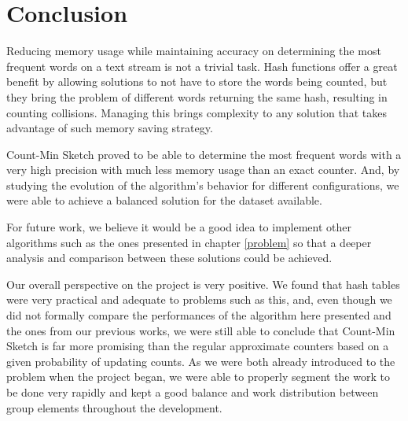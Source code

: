 \documentclass[shortpaper]{revdetua}
\begin{document}
\newpage
\section{Conclusion}

Reducing memory usage while maintaining accuracy on determining the most frequent words on a text stream is not a trivial task.
Hash functions offer a great benefit by allowing solutions to not have to store the words being counted, but they bring the problem of different words 
returning the same hash, resulting in counting collisions.
Managing this brings complexity to any solution that takes advantage of such memory saving strategy. 

Count-Min Sketch proved to be able to determine the most frequent words with a very high precision with much less memory usage than an exact counter.
And, by studying the evolution of the algorithm's behavior for different configurations, we were able to achieve a balanced solution for the dataset available.

For future work, we believe it would be a good idea to implement other algorithms such as the ones presented in chapter \ref{problem} so that a deeper analysis 
and comparison between these solutions could be achieved.

Our overall perspective on the project is very positive.
We found that hash tables were very practical and adequate to problems such as this, and, even though we did not formally compare the performances of the 
algorithm here presented and the ones from our previous works, we were still able to conclude that Count-Min Sketch is far more promising than the regular 
approximate counters based on a given probability of updating counts.
As we were both already introduced to the problem when the project began, we were able to properly segment the work to be done very rapidly and kept a good 
balance and work distribution between group elements throughout the development.


 

\clearpage
\appendix
\end{document}
